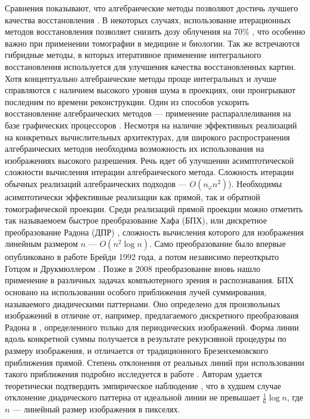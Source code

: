 Сравнения показывают, что алгебраические методы позволяют достичь лучшего качества восстановления \cite{sirt_less_artifacts, Lucas_sota_ir_survey_2015_radiology}.
В некоторых случаях, использование итерационных методов восстановления позволяет снизить дозу облучения на 70\% \cite{Willemink2013}, что особенно важно при применении томографии в медицине и биологии.
Так же встречаются гибридные методы, в которых итеративное применение интегрального восстановления используется для улучшения качества восстановленных картин.
Хотя концептуально алгебраические методы проще интегральных и лучше справляются с наличием высокого уровня шума в проекциях, они проигрывают последним по времени реконструкции.
Один из способов ускорить восстановление алгебраических методов --- применение распараллеливания на базе графических процессоров \cite{buz2011cuda, sirt_gpu}.
Несмотря на наличие эффективных реализаций на конкретных вычислительных архитектурах, для широкого распространения алгебраических методов необходима возможность их использования на изображениях высокого разрешения.
Речь идет об улучшении асимптотической сложности вычисления итерации алгебраического метода.
Сложность итерации обычных реализаций алгебраических подходов --- $O(n_\varphi n^2)$).
Необходимы асимптотически эффективные реализации как прямой, так и обратной томографической проекции.
Среди реализаций прямой проекции можно отметить так называемоем быстрое преобразование Хафа (БПХ), или дискретное преобразование Радона (ДПР) \cite{Brady1998, brady1992fast, hough, gotz1996fast}, сложность вычисления которого для изображения линейным размером $n$ --- $O(n^2 \log n)$.
Само преобразование было впервые опубликовано в работе Брейди 1992 года\cite{brady1992fast}, а потом независимо переоткрыто Готцом и Друкмюллером \cite{gotz1996fast}.
Позже в 2008 \cite{hough} преобразование вновь нашло применение в различных задачах компьютерного зрения и распознавания.
БПХ основано на использовании особого приближения лучей суммирования, называемого диадическими паттернами.
Оно определено для произвольных изображений в отличие от, например, предлагаемого дискретного преобразоваия Радона в \cite{Beylkin_DRT}, определенного только для периодических изображений.
Форма линии вдоль конкретной суммы получается в результате рекурсивной процедуры по размеру изображения, и отличается от традиционного Брезенхемовского приближения прямой.
Степень отклонения от реальных линий при использовании такого приближения подробно исследуется в работе \cite{ershov2015dyadic}.
Авторам удается теоретически подтвердить эмпирическое наблюдение \cite{Brady1998}, что в худшем случае отклонение диадического паттерна от идеальной линии не превышает $\frac 1 6 \log n$, где $n$ --- линейный размер изображения в пикселях.
